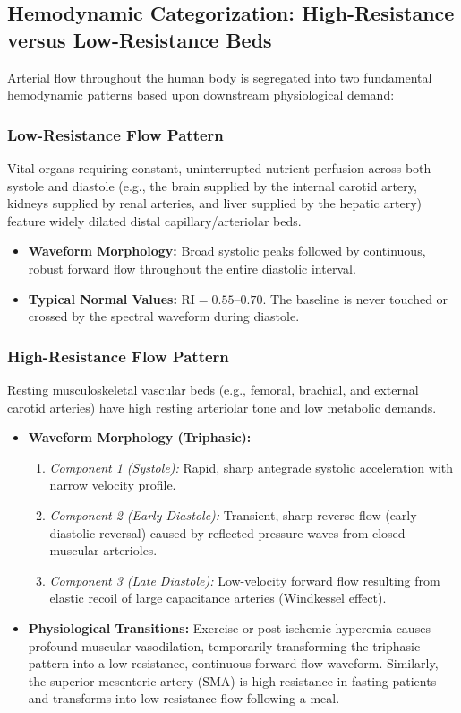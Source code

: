 \documentclass[11pt,a4paper]{article}
\begin{document}
\subsection{Hemodynamic Categorization: High-Resistance versus Low-Resistance Beds}

Arterial flow throughout the human body is segregated into two fundamental hemodynamic patterns based upon downstream physiological demand:

\subsubsection{Low-Resistance Flow Pattern}
Vital organs requiring constant, uninterrupted nutrient perfusion across both systole and diastole (e.g., the brain supplied by the internal carotid artery, kidneys supplied by renal arteries, and liver supplied by the hepatic artery) feature widely dilated distal capillary/arteriolar beds.
\begin{itemize}[leftmargin=*]
    \item \textbf{Waveform Morphology:} Broad systolic peaks followed by continuous, robust forward flow throughout the entire diastolic interval.
    \item \textbf{Typical Normal Values:} $\text{RI} = 0.55\text{--}0.70$. The baseline is never touched or crossed by the spectral waveform during diastole.
\end{itemize}

\subsubsection{High-Resistance Flow Pattern}
Resting musculoskeletal vascular beds (e.g., femoral, brachial, and external carotid arteries) have high resting arteriolar tone and low metabolic demands.
\begin{itemize}[leftmargin=*]
    \item \textbf{Waveform Morphology (Triphasic):}
    \begin{enumerate}
        \item \textit{Component 1 (Systole):} Rapid, sharp antegrade systolic acceleration with narrow velocity profile.
        \item \textit{Component 2 (Early Diastole):} Transient, sharp reverse flow (early diastolic reversal) caused by reflected pressure waves from closed muscular arterioles.
        \item \textit{Component 3 (Late Diastole):} Low-velocity forward flow resulting from elastic recoil of large capacitance arteries (Windkessel effect).
    \end{enumerate}
    \item \textbf{Physiological Transitions:} Exercise or post-ischemic hyperemia causes profound muscular vasodilation, temporarily transforming the triphasic pattern into a low-resistance, continuous forward-flow waveform. Similarly, the superior mesenteric artery (SMA) is high-resistance in fasting patients and transforms into low-resistance flow following a meal.
\end{itemize}
\end{document}
